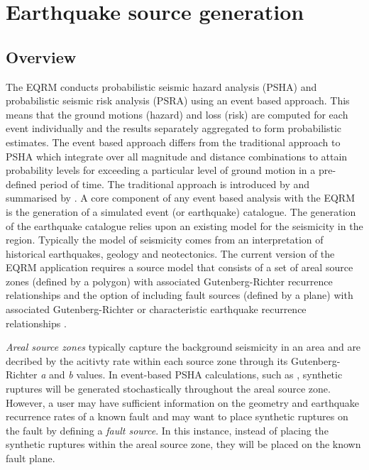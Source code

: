 \chapter{Earthquake source generation}
\label{ch:source}

\section{Overview}

The EQRM conducts probabilistic seismic hazard analysis (PSHA) and
probabilistic seismic risk analysis (PSRA) using an event based
approach. This means that the ground motions (hazard) and loss
(risk) are computed for each event individually and the results
separately aggregated to form probabilistic estimates. The event
based approach differs from the traditional approach to PSHA which
integrate over all magnitude and distance combinations to attain
probability levels for exceeding a particular level of ground
motion in a pre-defined period of time. The traditional approach
is introduced by \citet{dr_Cornell68a} and summarised by
\citet{dr_McGuire90a}. A core component of any event based
analysis with the EQRM is the generation of a simulated
event (or earthquake) catalogue. The
generation of the earthquake catalogue relies upon an existing model for
the seismicity in the region. Typically the  model of seismicity comes
 from an interpretation of historical earthquakes,
 geology and neotectonics. The current version of the EQRM application requires a source model
that consists of a set of areal source zones (defined by a polygon) with associated
Gutenberg-Richter recurrence relationships and the option of including fault sources (defined by a plane) with associated 
Gutenberg-Richter or characteristic earthquake recurrence relationships \citet{dr_Schwartz84}. 

\emph{Areal source zones} typically capture the background seismicity in an area and are decribed by the acitivty rate within
each source zone through its Gutenberg-Richter \emph{a} and \emph{b} values. In event-based PSHA calculations, such as ,
synthetic ruptures will be generated stochastically throughout the areal source zone. However, a user may have sufficient information 
on the geometry and earthquake recurrence rates of a known fault and may want to place synthetic ruptures on the fault by defining a 
\emph{fault source}. In this instance, instead of placing the synthetic ruptures within the areal source zone, they will be placed 
on the known fault plane. \\

